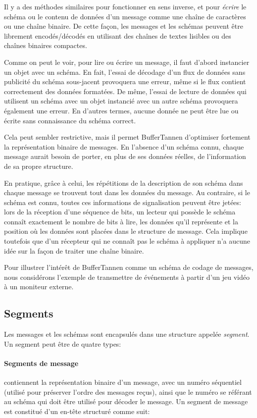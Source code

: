 Il y a des méthodes similaires pour fonctionner en sens inverse, et pour \emph {écrire} le schéma ou le contenu de données d'un message comme une chaîne de caractères ou une chaîne binaire. De cette façon, les messages et les schémas peuvent être librement encodés/décodés en utilisant des chaînes de textes lisibles ou des chaînes binaires compactes.

Comme on peut le voir, pour lire ou écrire un message, il faut d'abord instancier un objet avec un schéma. En fait, l'essai de décodage d'un flux de données sans publicité du schéma sous-jacent provoquera une erreur, même si le flux contient correctement des données formatées. De même, l'essai de lecture de données qui utilisent un  schéma avec un objet instancié avec un autre schéma provoquera également une erreur. En d'autres termes, aucune donnée ne peut être lue ou écrite sans connaissance du schéma correct.

Cela peut sembler restrictive, mais il permet BufferTannen d'optimiser fortement la représentation binaire de messages. En l'absence d'un schéma connu, chaque message aurait besoin de porter, en plus de ses données réelles, de l'information de sa propre structure.

En pratique, grâce à celui, les répétitions de la description de son schéma dans chaque message se trouvent tout dans les données du message. Au contraire, si le schéma est connu, toutes ces informations de signalisation peuvent être jetées: lors de la réception d'une séquence de bits, un lecteur qui possède le schéma connaît exactement le nombre de bits à lire, les données qu'il représente et la position où les données sont placées dans le structure de message. Cela implique toutefois que d'un récepteur qui ne connaît pas le schéma à appliquer n'a aucune idée sur la façon de traiter une chaîne binaire.

Pour illustrer l'intérêt de BufferTannen comme un schéma de codage de messages, nous considérons l'exemple de transmettre de événements à partir d'un jeu vidéo à un moniteur externe.

\subsection{Segments}
\setcounter{paragraph}{0}

Les messages et les schémas sont encapsulés dans une structure appelée \emph{segment}. Un segment peut être de quatre types:

\paragraph{Segments de message} contiennent la représentation binaire d'un message, avec un numéro séquentiel (utilisé pour préserver l'ordre des messages reçus), ainsi que le numéro se référant au schéma qui doit être utilisé pour décoder le message. Un segment de message est constitué d'un en-tête structuré comme suit:

